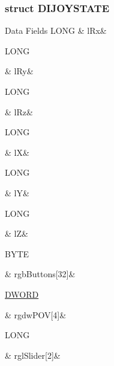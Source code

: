 \subsubsection{struct D\-I\-J\-O\-Y\-S\-T\-A\-T\-E}
\begin{DoxyFields}{Data Fields}
\hypertarget{a00003_ae787bcbafe0c743edb3cc7908a9ec614}{L\-O\-N\-G}\label{a00003_ae787bcbafe0c743edb3cc7908a9ec614}
&
l\-Rx&
\\
\hline

\hypertarget{a00003_a224cc5c8c3276d717e40adb86bca63af}{L\-O\-N\-G}\label{a00003_a224cc5c8c3276d717e40adb86bca63af}
&
l\-Ry&
\\
\hline

\hypertarget{a00003_af3ec962f9ea47f6a29972d2991c971d7}{L\-O\-N\-G}\label{a00003_af3ec962f9ea47f6a29972d2991c971d7}
&
l\-Rz&
\\
\hline

\hypertarget{a00003_a5caab2f62348491c05eb56720be4ed99}{L\-O\-N\-G}\label{a00003_a5caab2f62348491c05eb56720be4ed99}
&
l\-X&
\\
\hline

\hypertarget{a00003_ae174db734839eb185acdb0cd79b9ba24}{L\-O\-N\-G}\label{a00003_ae174db734839eb185acdb0cd79b9ba24}
&
l\-Y&
\\
\hline

\hypertarget{a00003_a7dd7142cab803f67cdcda10d1eb720fd}{L\-O\-N\-G}\label{a00003_a7dd7142cab803f67cdcda10d1eb720fd}
&
l\-Z&
\\
\hline

\hypertarget{a00003_aaf96f3fe3fcadcb6549bcac3fdd6a326}{B\-Y\-T\-E}\label{a00003_aaf96f3fe3fcadcb6549bcac3fdd6a326}
&
rgb\-Buttons\mbox{[}32\mbox{]}&
\\
\hline

\hypertarget{a00003_ae49cd858af76a488ea366d4b7b6be542}{\hyperlink{a00003_a50e15ae51c87ae06ab29c8148cb5f36c}{D\-W\-O\-R\-D}}\label{a00003_ae49cd858af76a488ea366d4b7b6be542}
&
rgdw\-P\-O\-V\mbox{[}4\mbox{]}&
\\
\hline

\hypertarget{a00003_ae16b25838a30c01d12eb11b79ca68018}{L\-O\-N\-G}\label{a00003_ae16b25838a30c01d12eb11b79ca68018}
&
rgl\-Slider\mbox{[}2\mbox{]}&
\\
\hline

\end{DoxyFields}
\label{d9/dec/a00090}
\hypertarget{a00003_d9/dec/a00090}{}
